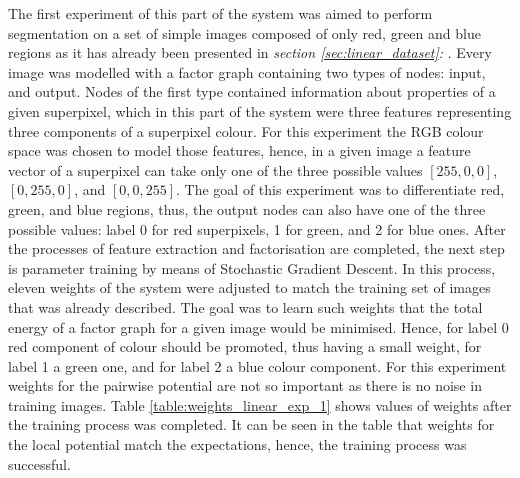 The first experiment of this part of the system was aimed to perform segmentation on a set of simple images composed of only red, green and blue regions as it has already been presented in \textit{section \ref{sec:linear_dataset}: }. Every image was modelled with a factor graph containing two types of nodes: input, and output. Nodes of the first type contained information about properties of a given superpixel, which in this part of the system were three features representing three components of a superpixel colour. For this experiment the RGB colour space was chosen to model those features, hence, in a given image a feature vector of a superpixel can take only one of the three possible values $[255,0,0]$, $[0,255,0]$, and $[0,0,255]$. The goal of this experiment was to differentiate red, green, and blue regions, thus, the output nodes can also have one of the three possible values: label 0 for red superpixels, 1 for green, and 2 for blue ones. After the processes of feature extraction and factorisation are completed, the next step is parameter training by means of Stochastic Gradient Descent. In this process, eleven weights of the system were adjusted to match the training set of images that was already described. The goal was to learn such weights that the total energy of a factor graph for a given image would be minimised. Hence, for label 0 red component of colour should be promoted, thus having a small weight, for label 1 a green one, and for label 2 a blue colour component. For this experiment weights for the pairwise potential are not so important as there is no noise in training images. Table \ref{table:weights_linear_exp_1} shows values of weights after the training process was completed. It can be seen in the table that weights for the local potential match the expectations, hence, the training process was successful.
